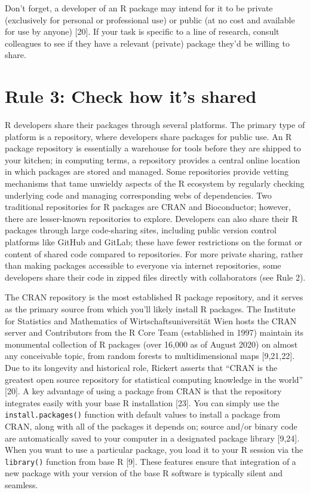 \documentclass[10pt,letterpaper]{article}
\begin{document}
Don't forget, a developer of an R package may intend for it to be
private (exclusively for personal or professional use) or public (at no
cost and available for use by anyone) {[}20{]}. If your task is specific
to a line of research, consult colleagues to see if they have a relevant
(private) package they'd be willing to share.

\hypertarget{rule-3-check-how-its-shared}{%
\section{Rule 3: Check how it's
shared}\label{rule-3-check-how-its-shared}}

R developers share their packages through several platforms. The primary
type of platform is a repository, where developers share packages for
public use. An R package repository is essentially a warehouse for tools
before they are shipped to your kitchen; in computing terms, a
repository provides a central online location in which packages are
stored and managed. Some repositories provide vetting mechanisms that
tame unwieldy aspects of the R ecosystem by regularly checking
underlying code and managing corresponding webs of dependencies. Two
traditional repositories for R packages are CRAN and Bioconductor;
however, there are lesser-known repositories to explore. Developers can
also share their R packages through large code-sharing sites, including
public version control platforms like GitHub and GitLab; these have
fewer restrictions on the format or content of shared code compared to
repositories. For more private sharing, rather than making packages
accessible to everyone via internet repositories, some developers share
their code in zipped files directly with collaborators (see Rule 2).

The CRAN repository is the most established R package repository, and it
serves as the primary source from which you'll likely install R
packages. The Institute for Statistics and Mathematics of
Wirtschaftsuniversität Wien hosts the CRAN server and Contributors from
the R Core Team (established in 1997) maintain its monumental collection
of R packages (over 16,000 as of August 2020) on almost any conceivable
topic, from random forests to multidimensional maps {[}9,21,22{]}. Due
to its longevity and historical role, Rickert asserts that ``CRAN is the
greatest open source repository for statistical computing knowledge in
the world'' {[}20{]}. A key advantage of using a package from CRAN is
that the repository integrates easily with your base R installation
{[}23{]}. You can simply use the \texttt{install.packages()} function
with default values to install a package from CRAN, along with all of
the packages it depends on; source and/or binary code are automatically
saved to your computer in a designated package library {[}9,24{]}. When
you want to use a particular package, you load it to your R session via
the \texttt{library()} function from base R {[}9{]}. These features
ensure that integration of a new package with your version of the base R
software is typically silent and seamless.
\end{document}

